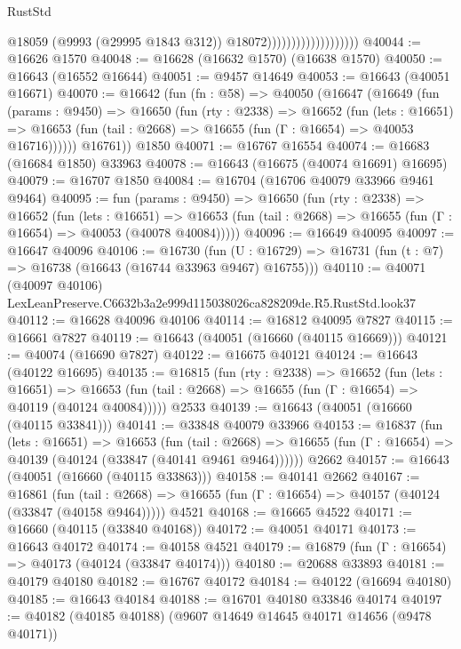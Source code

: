 \begin{lexlean}{RustStd}
\begin{coremodule}
                                          @18059
                                          (@9993 (@29995 @1843 @312))
                                          @18072)))))))))))))))))))
@40044 := @16626 @1570
@40048 := @16628 (@16632 @1570) (@16638 @1570)
@40050 := @16643 (@16552 @16644)
@40051 := @9457 @14649
@40053 := @16643 (@40051 @16671)
@40070 := @16642
    (fun (fn : @58) =>
    @40050
      (@16647
        (@16649
          (fun (params : @9450) =>
          @16650
            (fun (rty : @2338) =>
            @16652
              (fun (lets : @16651) =>
              @16653 (fun (tail : @2668) => @16655 (fun (Γ : @16654) => @40053 @16716))))))
        @16761))
    @1850
@40071 := @16767 @16554
@40074 := @16683 (@16684 @1850) @33963
@40078 := @16643 (@16675 (@40074 @16691) @16695)
@40079 := @16707 @1850
@40084 := @16704 (@16706 @40079 @33966 @9461 @9464)
@40095 := fun (params : @9450) =>
  @16650
    (fun (rty : @2338) =>
    @16652
      (fun (lets : @16651) =>
      @16653 (fun (tail : @2668) => @16655 (fun (Γ : @16654) => @40053 (@40078 @40084)))))
@40096 := @16649 @40095
@40097 := @16647 @40096
@40106 := @16730
    (fun (U : @16729) => @16731 (fun (t : @7) => @16738 (@16643 (@16744 @33963 @9467) @16755)))
@40110 := @40071 (@40097 @40106) LexLeanPreserve.C6632b3a2e999d115038026ca828209de.R5.RustStd.look37
@40112 := @16628 @40096 @40106
@40114 := @16812 @40095 @7827
@40115 := @16661 @7827
@40119 := @16643 (@40051 (@16660 (@40115 @16669)))
@40121 := @40074 (@16690 @7827)
@40122 := @16675 @40121
@40124 := @16643 (@40122 @16695)
@40135 := @16815
    (fun (rty : @2338) =>
    @16652
      (fun (lets : @16651) =>
      @16653 (fun (tail : @2668) => @16655 (fun (Γ : @16654) => @40119 (@40124 @40084)))))
    @2533
@40139 := @16643 (@40051 (@16660 (@40115 @33841)))
@40141 := @33848 @40079 @33966
@40153 := @16837
    (fun (lets : @16651) =>
    @16653
      (fun (tail : @2668) =>
      @16655 (fun (Γ : @16654) => @40139 (@40124 (@33847 (@40141 @9461 @9464))))))
    @2662
@40157 := @16643 (@40051 (@16660 (@40115 @33863)))
@40158 := @40141 @2662
@40167 := @16861
    (fun (tail : @2668) => @16655 (fun (Γ : @16654) => @40157 (@40124 (@33847 (@40158 @9464)))))
    @4521
@40168 := @16665 @4522
@40171 := @16660 (@40115 (@33840 @40168))
@40172 := @40051 @40171
@40173 := @16643 @40172
@40174 := @40158 @4521
@40179 := @16879 (fun (Γ : @16654) => @40173 (@40124 (@33847 @40174)))
@40180 := @20688 @33893
@40181 := @40179 @40180
@40182 := @16767 @40172
@40184 := @40122 (@16694 @40180)
@40185 := @16643 @40184
@40188 := @16701 @40180 @33846 @40174
@40197 := @40182 (@40185 @40188) (@9607 @14649 @14645 @40171 @14656 (@9478 @40171))

\end{coremodule}
\end{lexlean}

